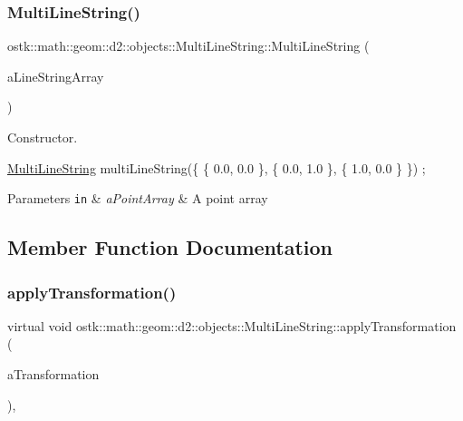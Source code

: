 \subsubsection{\texorpdfstring{Multi\+Line\+String()}{MultiLineString()}}
{\footnotesize\ttfamily ostk\+::math\+::geom\+::d2\+::objects\+::\+Multi\+Line\+String\+::\+Multi\+Line\+String (\begin{DoxyParamCaption}\item[{const Array$<$ \hyperlink{classostk_1_1math_1_1geom_1_1d2_1_1objects_1_1_line_string}{Line\+String} $>$ \&}]{a\+Line\+String\+Array }\end{DoxyParamCaption})}



Constructor. 


\begin{DoxyCode}
\hyperlink{classostk_1_1math_1_1geom_1_1d2_1_1objects_1_1_multi_line_string_a5a30febbcbc28097e34b6f2f3f456b79}{MultiLineString} multiLineString(\{ \{ 0.0, 0.0 \}, \{ 0.0, 1.0 \}, \{ 1.0, 0.0 \} \}) ;
\end{DoxyCode}



\begin{DoxyParams}[1]{Parameters}
\mbox{\tt in}  & {\em a\+Point\+Array} & A point array \\
\hline
\end{DoxyParams}


\subsection{Member Function Documentation}
\mbox{\label{classostk_1_1math_1_1geom_1_1d2_1_1objects_1_1_multi_line_string_ada5fe5a183b6628831867b416901459e}} 
\subsubsection{\texorpdfstring{apply\+Transformation()}{applyTransformation()}}
{\footnotesize\ttfamily virtual void ostk\+::math\+::geom\+::d2\+::objects\+::\+Multi\+Line\+String\+::apply\+Transformation (\begin{DoxyParamCaption}\item[{const \hyperlink{classostk_1_1math_1_1geom_1_1d2_1_1_transformation}{Transformation} \&}]{a\+Transformation }\end{DoxyParamCaption})\hspace{0.3cm}{\ttfamily [override]}, {\ttfamily [virtual]}}



